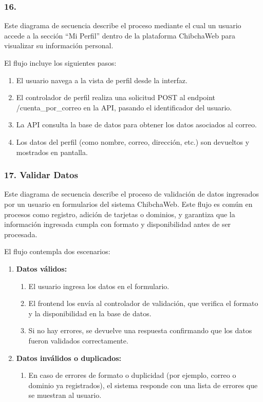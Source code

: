 \subsubsection*{16. }

Este diagrama de secuencia describe el proceso mediante el cual un usuario accede a la sección “Mi Perfil” dentro de la plataforma ChibchaWeb para visualizar su información personal.

El flujo incluye los siguientes pasos:

\begin{enumerate}
\item El usuario navega a la vista de perfil desde la interfaz.
\item El controlador de perfil realiza una solicitud POST al endpoint /cuenta\_por\_correo en la API, pasando el identificador del usuario.
\item La API consulta la base de datos para obtener los datos asociados al correo.
\item Los datos del perfil (como nombre, correo, dirección, etc.) son devueltos y mostrados en pantalla.
\end{enumerate}

\subsubsection*{17. Validar Datos}

Este diagrama de secuencia describe el proceso de validación de datos ingresados por un usuario en formularios del sistema ChibchaWeb. Este flujo es común en procesos como registro, adición de tarjetas o dominios, y garantiza que la información ingresada cumpla con formato y disponibilidad antes de ser procesada.

El flujo contempla dos escenarios:

\begin{enumerate}
    \item \textbf{Datos válidos:}
    \begin{enumerate}
        \item El usuario ingresa los datos en el formulario.
        \item El frontend los envía al controlador de validación, que verifica el formato y la disponibilidad en la base de datos.
        \item Si no hay errores, se devuelve una respuesta confirmando que los datos fueron validados correctamente.
    \end{enumerate}

    \item \textbf{Datos inválidos o duplicados:}
    \begin{enumerate}
    	\item En caso de errores de formato o duplicidad (por ejemplo, correo o dominio ya registrados), el sistema responde con una lista de errores que se muestran al usuario.
    \end{enumerate}
\end{enumerate}

